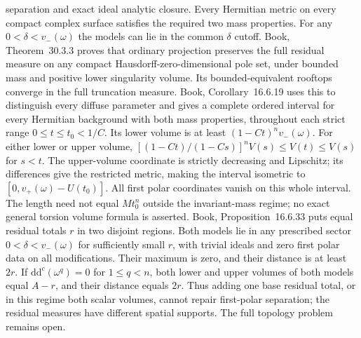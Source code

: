 \documentclass[11pt]{article}
\newcommand{\ddc}{\mathrm d\mathrm d^c}
\begin{document}
separation and exact ideal analytic closure. Every Hermitian metric on every compact complex surface satisfies the required two mass properties. For any $0<\delta<v_-(\omega)$ the models can lie in the common $\delta$ cutoff. Book, Theorem~30.3.3 proves that ordinary projection preserves the full residual measure on any compact Hausdorff-zero-dimensional pole set, under bounded mass and positive lower singularity volume. Its bounded-equivalent rooftops converge in the full truncation measure. Book, Corollary~16.6.19 uses this to distinguish every diffuse parameter and gives a complete ordered interval for every Hermitian background with both mass properties, throughout each strict range $0\leq t\leq t_0<1/C$. Its lower volume is at least $(1-Ct)^nv_-(\omega)$. For either lower or upper volume, $[(1-Ct)/(1-Cs)]^nV(s)\leq V(t)\leq V(s)$ for $s<t$. The upper-volume coordinate is strictly decreasing and Lipschitz; its differences give the restricted metric, making the interval isometric to $[0,v_+(\omega)-U(t_0)]$. All first polar coordinates vanish on this whole interval. The length need not equal $Mt_0^n$ outside the invariant-mass regime; no exact general torsion volume formula is asserted. Book, Proposition~16.6.33 puts equal residual totals $r$ in two disjoint regions. Both models lie in any prescribed sector $0<\delta<v_-(\omega)$ for sufficiently small $r$, with trivial ideals and zero first polar data on all modifications. Their maximum is zero, and their distance is at least $2r$. If $\ddc(\omega^q)=0$ for $1\leq q<n$, both lower and upper volumes of both models equal $A-r$, and their distance equals $2r$. Thus adding one base residual total, or in this regime both scalar volumes, cannot repair first-polar separation; the residual measures have different spatial supports. The full topology problem remains open.
\end{document}

